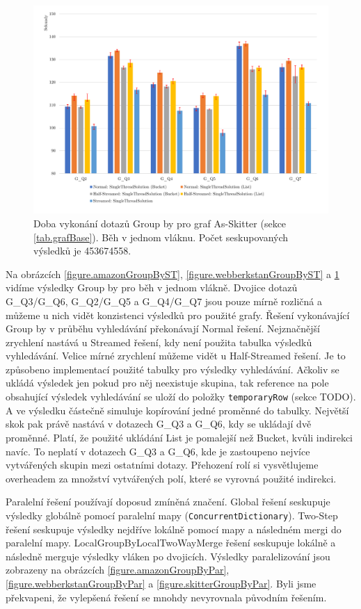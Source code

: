 \begin{figure}[!htp]
\includegraphics[width=\linewidth]{../img/skitterGroupByST.pdf}\centering
\caption{Doba vykonání dotazů Group by pro graf As-Skitter (sekce \ref{tab.grafBase}). Běh v jednom vláknu. Počet seskupovaných výsledků je 453674558.}
\label{figure.skitterGroupByST}
\end{figure}

Na obrázcích \ref{figure.amazonGroupByST}, \ref{figure.webberkstanGroupByST} a \ref{figure.skitterGroupByST} vidíme výsledky Group by pro běh v jednom vlákně.
Dvojice dotazů G\_Q3/G\_Q6, G\_Q2/G\_Q5 a G\_Q4/G\_Q7 jsou pouze mírně rozličná a můžeme u nich vidět konzistenci výsledků pro použité grafy.
Řešení vykonávající Group by v průběhu vyhledávání překonávají Normal řešení. 
Nejznačnější zrychlení nastává u Streamed řešení, kdy není použita tabulka výsledků vyhledávání.
Velice mírné zrychlení můžeme vidět u Half-Streamed řešení.
Je to způsobeno implementací použité tabulky pro výsledky vyhledávání. 
Ačkoliv se ukládá výsledek jen pokud pro něj neexistuje skupina, tak reference na pole obsahující výsledek vyhledávání se uloží do položky \verb+temporaryRow+ (sekce TODO).
A ve výsledku částečně simuluje kopírování jedné proměnné do tabulky. 
Největší skok pak právě nastává v dotazech G\_Q3 a G\_Q6, kdy se ukládají dvě proměnné.
Platí, že použité ukládání List je pomalejší než Bucket, kvůli indirekci navíc. 
To neplatí v dotazech G\_Q3 a G\_Q6, kde je zastoupeno nejvíce vytvářených skupin mezi ostatními dotazy.
Přehození rolí si vysvětlujeme overheadem za množství vytvářených polí, které se vyrovná použité indirekci.

Paralelní řešení používají doposud zmíněná značení.
Global řešení seskupuje výsledky globálně pomocí paralelní mapy (\verb+ConcurrentDictionary+).
Two-Step řešení seskupuje výsledky nejdříve lokálně pomocí mapy a následném mergi do paralelní mapy.
LocalGroupByLocalTwoWayMerge řešení seskupuje lokálně a následně merguje výsledky vláken po dvojicích.
Výsledky paralelizování jsou zobrazeny na obrázcích \ref{figure.amazonGroupByPar}, \ref{figure.webberkstanGroupByPar} a \ref{figure.skitterGroupByPar}.
Byli jsme překvapeni, že vylepšená řešení se mnohdy nevyrovnala původním řešením.

